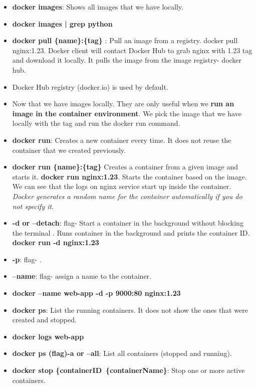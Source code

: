 \documentclass{article}
\begin{document}
\begin{tcolorbox}[colback=red!5!white, colframe=red!50!black,title=Commands] 
\begin{itemize}
    \item \textbf{docker images}: Shows all images that we have locally.
    \item \textbf{docker images | grep python}
    \item \textbf{docker pull \{name\}:\{tag\} }: Pull an image from a registry. docker pull nginx:1.23. Docker client will contact Docker Hub to grab nginx with 1.23 tag and download it locally. It pulls the image from the image registry- docker hub. 
    \item Docker Hub registry (docker.io) is used by default. 
    \item Now that we have images locally. They are only useful when we \textbf{run an image in the container environment}. We pick the image that we have locally with the tag and run the docker run command.
    \item \textbf{docker run}: Creates a new container every time. It does not reuse the container that we created previously.
    \item \textbf{docker run \{name\}:\{tag\} } Creates a container from a given image and starts it. \textbf{docker run nginx:1.23}. Starts the container based on the image. We can see that the logs on nginx service start up inside the container. \textit{Docker generates a random name for the container automatically if you do not specify it}.
    \item \textbf{-d or --detach}: flag- Start a container in the background without blocking the terminal . Runs container in the background and prints the container ID. \textbf{docker run -d nginx:1.23}
    \item \textbf{-p}: flag- .
    \item \textbf{--name}: flag- assign a name to the container.
    \item \textbf{docker --name web-app -d -p 9000:80 nginx:1.23}
    \item \textbf{docker ps}: List the running containers. It does not show the ones that were created and stopped.
    \item \textbf{docker logs web-app}
    \item \textbf{docker ps (flag)-a or --all}: List all containers (stopped and running). 
    \item \textbf{docker stop \{containerID\ \{containerName\}}: Stop one or more active containers.

\end{itemize}
\end{tcolorbox}
\end{document}
